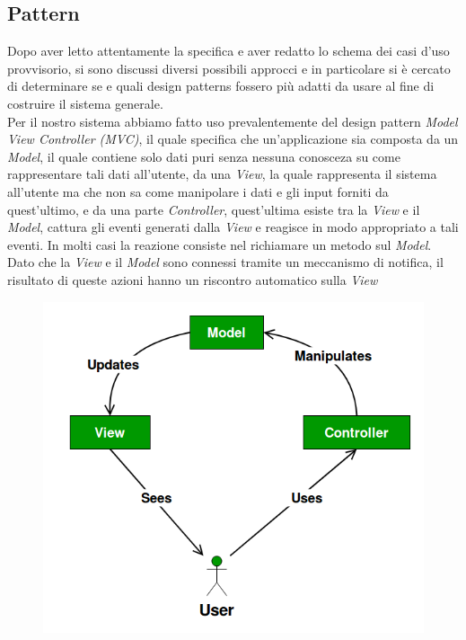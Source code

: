 \documentclass[a4paper,12pt,titlepage]{article}
\begin{document}
\subsection{Pattern}\label{sec:pattern}
Dopo aver letto attentamente la specifica e aver redatto lo schema dei casi d’uso provvisorio, si sono discussi diversi possibili approcci e in particolare si è cercato di determinare se e quali design patterns fossero più adatti da usare al fine di costruire il
sistema generale.\\ Per il nostro sistema abbiamo fatto uso prevalentemente del design pattern \textit{Model View Controller (MVC)}, il quale specifica che un'applicazione sia composta da un \textit{Model}, il quale contiene solo dati puri senza nessuna conosceza su come rappresentare tali dati all'utente, da una \textit{View}, la quale rappresenta il sistema all'utente ma che non sa come manipolare i dati e gli input forniti da quest'ultimo, e da una parte \textit{Controller}, quest'ultima esiste tra la \textit{View} e il \textit{Model}, cattura gli eventi generati dalla \textit{View} e reagisce in modo appropriato a tali eventi. In molti casi la reazione consiste nel richiamare un metodo sul \textit{Model}. Dato che la \textit{View} e il \textit{Model} sono connessi tramite un meccanismo di notifica, il risultato di queste azioni hanno un riscontro automatico sulla \textit{View}

\begin{figure}[H]
		\centering
		\includegraphics[scale=0.45]{MVC}
\end{figure}
\end{document}
